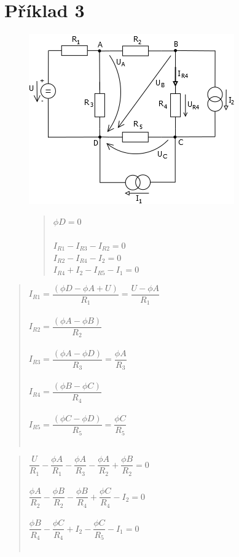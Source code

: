 \section{Příklad 3}
\begin{figure}[H]
    \centering
    \includegraphics[scale=0.8]{pic3/Pr3_2022.png}
    \begin{quote}
        \centering
	   $\phi D = 0$ \\~\\
	   $I_{R1} - I_{R3} - I_{R2}  = 0$ \\
	   $I_{R2} - I_{R4} - I_2 = 0$ \\
	   $I_{R4} + I_2 - I_{R5} - I_1 = 0$ \\
    \end{quote}
\end{figure}
\newpage
\begin{quote}
    \centering
    $I_{R1} = \dfrac{(\phi D - \phi A + U)}{R_1} = \dfrac{U - \phi A}{R_1} $ \\~\\
    $I_{R2} = \dfrac{(\phi A - \phi B)}{R_2} $ \\~\\
    $I_{R3} = \dfrac{(\phi A - \phi D)}{R_3} = \dfrac{\phi A}{R_3}$ \\~\\
    $I_{R4} = \dfrac{(\phi B - \phi C)}{R_4} $ \\~\\
    $I_{R5} = \dfrac{(\phi C - \phi D )}{R_5} = \dfrac{\phi C}{R_5} $ \\~\\ 
\end{quote}
\begin{quote}
    \medskip
    \medskip
    \centering
    $\dfrac{U}{R_1} - \dfrac{\phi A}{R_1} -  \dfrac{\phi A}{R_3} - \dfrac{\phi A}{R_2} + \dfrac{\phi B}{R_2} = 0$ \\~\\ 
    $\dfrac{\phi A}{R_2} -  \dfrac{\phi B}{R_2} - \dfrac{\phi B}{R_4} + \dfrac{\phi C}{R_4} - I_2 = 0$ \\~\\ 
    $\dfrac{\phi B}{R_4} - \dfrac{\phi C}{R_4} + I_2 - \dfrac{\phi C}{R_5} - I_1 = 0$ \\~\\ 
\end{quote}
